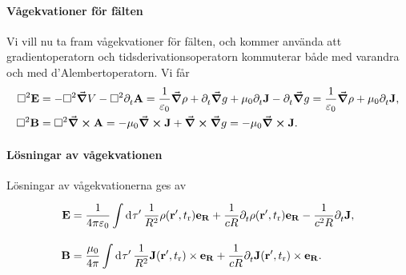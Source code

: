 \paragraph{Vågekvationer för fälten}
Vi vill nu ta fram vågekvationer för fälten, och kommer använda att gradientoperatorn och tidsderivationsoperatorn kommuterar både med varandra och med d'Alembertoperatorn. Vi får
\begin{align*}
	\Box^{2}{\vb{E}} &= -\Box^{2}{\grad{V}} - \Box^{2}{\partial_{t}^{}\vb{A}} = \frac{1}{\varepsilon_{0}}\grad{\rho} + \partial_{t}^{}\grad{g} + \mu_{0}\partial_{t}^{}\vb{J} - \partial_{t}^{}\grad{g} = \frac{1}{\varepsilon_{0}}\grad{\rho} + \mu_{0}\partial_{t}^{}\vb{J}, \\
	\Box^{2}{\vb{B}} &= \Box^{2}{\curl{\vb{A}}} = -\mu_{0}\curl{\vb{J}} + \curl{\grad{g}} = -\mu_{0}\curl{\vb{J}}.
\end{align*}

\paragraph{Lösningar av vågekvationen}
Lösningar av vågekvationerna ges av
\begin{align*}
	\vb{E} &= \frac{1}{4\pi\varepsilon_{0}}\int\limits_{}^{}\dd[]{\tau'}\frac{1}{R^{2}}\rho(\vb{r}', t_{\text{r}})\vb{e}_{\vb{R}} + \frac{1}{cR}\partial_{t}^{}\rho(\vb{r}', t_{\text{r}})\vb{e}_{\vb{R}} - \frac{1}{c^{2}R}\partial_{t}^{}\vb{J}, \\
	\vb{B} &= \frac{\mu_{0}}{4\pi}\int\limits_{}^{}\dd[]{\tau'}\frac{1}{R^{2}}\vb{J}(\vb{r}', t_{\text{r}})\times\vb{e}_{\vb{R}} + \frac{1}{cR}\partial_{t}^{}\vb{J}(\vb{r}', t_{\text{r}})\times\vb{e}_{\vb{R}}.
\end{align*}
